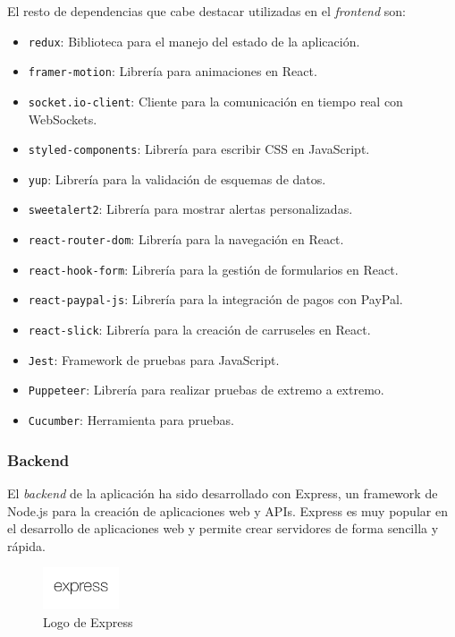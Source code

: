 El resto de dependencias que cabe destacar utilizadas en el \textit{frontend} son:
\begin{itemize}
        \item \texttt{redux}: Biblioteca para el manejo del estado de la aplicación.
        \item \texttt{framer-motion}: Librería para animaciones en React.
        \item \texttt{socket.io-client}: Cliente para la comunicación en tiempo real con WebSockets.
        \item \texttt{styled-components}: Librería para escribir CSS en JavaScript.
        \item \texttt{yup}: Librería para la validación de esquemas de datos.
        \item \texttt{sweetalert2}: Librería para mostrar alertas personalizadas.
        \item \texttt{react-router-dom}: Librería para la navegación en React.
        \item \texttt{react-hook-form}: Librería para la gestión de formularios en React.
        \item \texttt{react-paypal-js}: Librería para la integración de pagos con PayPal.
        \item \texttt{react-slick}: Librería para la creación de carruseles en React.
        \item \texttt{Jest}: Framework de pruebas para JavaScript.
        \item \texttt{Puppeteer}: Librería para realizar pruebas de extremo a extremo.
        \item \texttt{Cucumber}: Herramienta para pruebas.
\end{itemize}



\subsubsection{Backend}
El \textit{backend} de la aplicación ha sido desarrollado con Express\cite{express}, un framework de Node.js para la creación de aplicaciones web y APIs.
Express es muy popular en el desarrollo de aplicaciones web y permite crear servidores de forma sencilla y rápida.

\begin{figure}[H]
    \centering
    \includegraphics[width=0.2\textwidth]{figures/7-Construccion/express.png}
    \caption{Logo de Express}
\end{figure}

